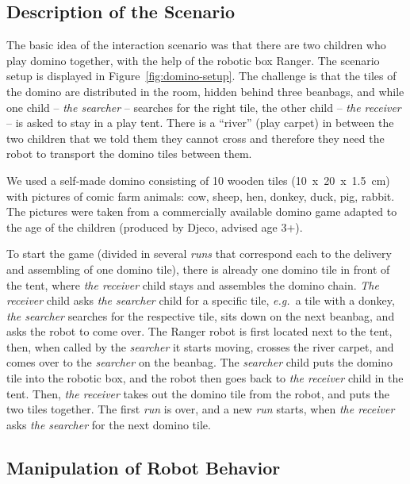 \documentclass{sig-alternate}
\newcommand{\eg}{{\textit{e.g.~}}}
\begin{document}
\subsection{Description of the Scenario}

The basic idea of the interaction scenario was that there are two children who
play domino together, with the help of the robotic box Ranger. The scenario
setup is displayed in Figure~\ref{fig:domino-setup}. The challenge is that the
tiles of the domino are distributed in the room, hidden behind three beanbags,
and while one child -- \textit{the searcher} -- searches for the right tile, the
other child -- \textit{the receiver} -- is asked to stay in a play tent. There
is a ``river'' (play carpet) in between the two children that we told them they
cannot cross and therefore they need the robot to transport the domino tiles
between them.

We used a self-made domino consisting of 10 wooden tiles (10~x~20~x~1.5~cm) with
pictures of comic farm animals: cow, sheep, hen, donkey, duck, pig, rabbit. The
pictures were taken from a commercially available domino game adapted to the age
of the children (produced by Djeco, advised age 3+). 

To start the game (divided in several \textit{runs} that correspond each to the
delivery and assembling of one domino tile), there is already one domino tile in
front of the tent, where \textit{the receiver} child stays and assembles the
domino chain. \textit{The receiver} child asks \textit{the searcher} child for a
specific tile, \eg a tile with a donkey, \textit{the searcher} searches for the
respective tile, sits down on the next beanbag, and asks the robot to come over.
The Ranger robot is first located next to the tent, then, when called by the
\textit{searcher} it starts moving, crosses the river carpet, and comes over to
the \textit{searcher} on the beanbag. The \textit{searcher} child puts the
domino tile into the robotic box, and the robot then goes back to \textit{the
receiver} child in the tent. Then, \textit{the receiver} takes out the domino
tile from the robot, and puts the two tiles together. The first \textit{run} is
over, and a new \textit{run} starts, when \textit{the receiver} asks \textit{the
searcher} for the next domino tile.

\subsection{Manipulation of Robot Behavior}
\label{sec:domino-manipulation}
\end{document}
